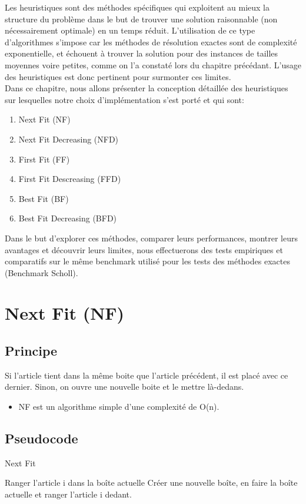 \documentclass[12pt]{article}
\begin{document}
\setcounter{section}{0}
Les heuristiques sont des méthodes spécifiques qui exploitent au mieux la structure du 
problème dans le but de trouver une solution raisonnable (non nécessairement optimale) en un temps réduit. 
L’utilisation de ce type d’algorithmes s'impose car les méthodes de résolution exactes sont 
de complexité exponentielle, et échouent à trouver la solution pour des instances de tailles moyennes voire petites,
 comme on l'a constaté lors du chapitre précédant. 
L'usage des heuristiques est donc pertinent pour surmonter ces limites.\\

Dans ce chapitre, nous allons présenter la conception détaillée des heuristiques sur lesquelles notre choix d’implémentation s’est porté et qui sont:
\begin{enumerate}
    \item Next Fit (NF)
    \item Next Fit Decreasing (NFD)
    \item First Fit (FF)
    \item First Fit Descreasing (FFD)
    \item Best Fit (BF)
    \item Best Fit Decreasing (BFD)\\
\end{enumerate}

Dans le but d’explorer ces méthodes, comparer leurs performances, montrer leurs avantages et découvrir leurs limites, nous effectuerons des tests empiriques et comparatifs sur le même benchmark utilisé pour les tests des méthodes exactes (Benchmark Scholl).
\newpage
\section{Next Fit (NF)}
\subsection{Principe}
Si l’article tient dans la même boite que l’article précédent, il est placé avec ce dernier. Sinon, on ouvre une nouvelle boite et le mettre là-dedans.
\begin{itemize}
    \item NF est un algorithme simple d’une complexité de O(n). 
\end{itemize}

\subsection{Pseudocode}
\begin{algorithm}[!h]
    \caption{Next Fit}
    \begin{algorithmic}
            \STATE Ranger l’article i dans la boîte actuelle
        \ELSE 
            \STATE Créer une nouvelle boîte, en faire la boîte actuelle et ranger l'article i dedant.
        \ENDIF
    \ENDFOR
    \end{algorithmic}
\end{algorithm}
\end{document}

